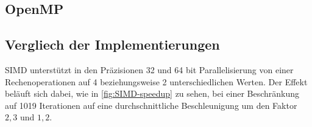 \subsection{OpenMP}


\subsection{Vergliech der Implementierungen}




SIMD unterstützt in den Präzisionen 32 und 64 bit Parallelisierung von einer Rechenoperationen auf
4 beziehungsweise 2 unterschiedlichen Werten. Der Effekt beläuft sich dabei, wie in \autoref{fig:SIMD-speedup} zu sehen,
bei einer Beschränkung auf 1019 Iterationen auf eine durchschnittliche Beschleunigung um den Faktor $2,3$ und $1,2$.

